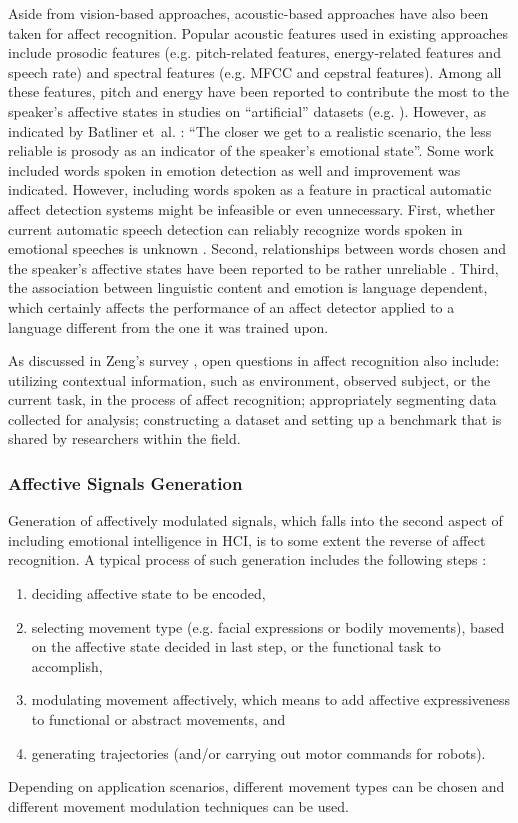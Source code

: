 Aside from vision-based approaches, acoustic-based approaches have also been taken for affect recognition. Popular acoustic features used in existing approaches include prosodic features (e.g. pitch-related features, energy-related features and speech rate) and spectral features (e.g. MFCC and cepstral features). Among all these features, pitch and energy have been reported to contribute the most to the speaker's affective states in studies on ``artificial'' datasets (e.g. \cite{kwon2003emotion}). However, as indicated by Batliner et~al. \cite{batliner2003find}: ``The closer we get to a realistic scenario, the less reliable is prosody as an indicator of the speaker's emotional state''. Some work \cite{lee2005toward} included words spoken in emotion detection as well and improvement was indicated. However, including words spoken as a feature in practical automatic affect detection systems might be infeasible or even unnecessary. First, whether current automatic speech detection can reliably recognize words spoken in emotional speeches is unknown \cite{athanaselis2005asr}. Second, relationships between words chosen and the speaker's affective states have been reported to be rather unreliable \cite{ambady1992thin}. Third, the association between linguistic content and emotion is language dependent, which certainly affects the performance of an affect detector applied to a language different from the one it was trained upon.

As discussed in Zeng's survey \cite{zeng2009survey}, open questions in affect recognition also include: utilizing contextual information, such as environment, observed subject, or the current task, in the process of affect recognition; appropriately segmenting data collected for analysis; constructing a dataset and setting up a benchmark that is shared by researchers within the field.

\subsubsection{Affective Signals Generation}

Generation of affectively modulated signals, which falls into the second aspect of including emotional intelligence in HCI, is to some extent the reverse of affect recognition. A typical process of such generation includes the following steps \cite{karg2013body}:
\begin{enumerate}
\item deciding affective state to be encoded,
\item selecting movement type (e.g. facial expressions or bodily movements), based on the affective state decided in last step, or the functional task to accomplish,
\item modulating movement affectively, which means to add affective expressiveness to functional or abstract movements, and
\item generating trajectories (and/or carrying out motor commands for robots).
\end{enumerate}
Depending on application scenarios, different movement types can be chosen and different movement modulation techniques can be used. 

